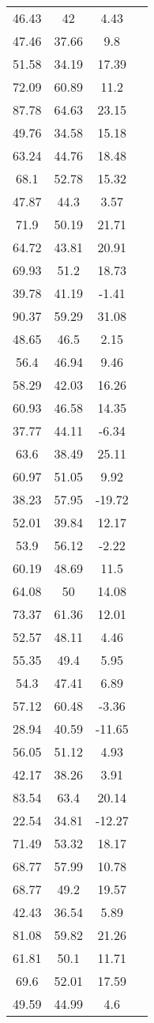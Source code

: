 \begin{longtable}{cccc}
46.43&42&4.43\\
47.46&37.66&9.8\\
51.58&34.19&17.39\\
72.09&60.89&11.2\\
87.78&64.63&23.15\\
49.76&34.58&15.18\\
63.24&44.76&18.48\\
68.1&52.78&15.32\\
47.87&44.3&3.57\\
71.9&50.19&21.71\\
64.72&43.81&20.91\\
69.93&51.2&18.73\\
39.78&41.19&-1.41\\
90.37&59.29&31.08\\
48.65&46.5&2.15\\
56.4&46.94&9.46\\
58.29&42.03&16.26\\
60.93&46.58&14.35\\
37.77&44.11&-6.34\\
63.6&38.49&25.11\\
60.97&51.05&9.92\\
38.23&57.95&-19.72\\
52.01&39.84&12.17\\
53.9&56.12&-2.22\\
60.19&48.69&11.5\\
64.08&50&14.08\\
73.37&61.36&12.01\\
52.57&48.11&4.46\\
55.35&49.4&5.95\\
54.3&47.41&6.89\\
57.12&60.48&-3.36\\
28.94&40.59&-11.65\\
56.05&51.12&4.93\\
42.17&38.26&3.91\\
83.54&63.4&20.14\\
22.54&34.81&-12.27\\
71.49&53.32&18.17\\
68.77&57.99&10.78\\
68.77&49.2&19.57\\
42.43&36.54&5.89\\
81.08&59.82&21.26\\
61.81&50.1&11.71\\
69.6&52.01&17.59\\
49.59&44.99&4.6\\

\end{longtable}
